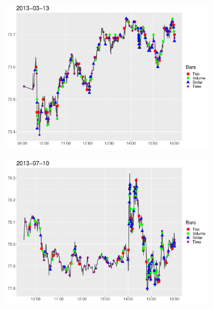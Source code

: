\begin{figure}[htbp]
	\centering
	\begin{subfigure}{.5\textwidth}
		\centering
		\includegraphics[scale=.25]{img/dataBars/sampling1}
	\end{subfigure}%
	\begin{subfigure}{.5\textwidth}
		\centering
		\includegraphics[scale=.25]{img/dataBars/sampling2}
	\end{subfigure}%

	\vspace{.4cm}


\end{figure}
